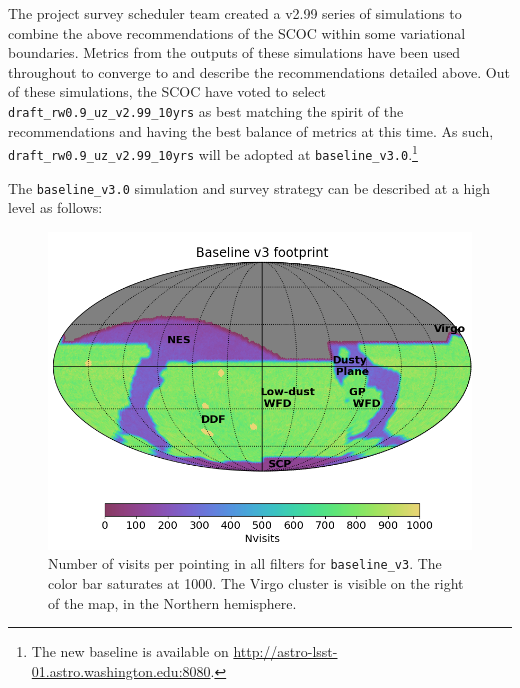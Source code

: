 The project survey scheduler team created a v2.99 series of simulations to combine the above recommendations of the SCOC within some variational boundaries. Metrics from the outputs of these simulations have been used throughout to converge to and describe the recommendations detailed above. Out of these simulations, the SCOC have voted to select \texttt{draft\_rw0.9\_uz\_v2.99\_10yrs} as best matching the spirit of the recommendations and having the best balance of metrics at this time. As such, \texttt{draft\_rw0.9\_uz\_v2.99\_10yrs} will be adopted at \texttt{baseline\_v3.0}.\footnote{The new baseline is available on \url{http://astro-lsst-01.astro.washington.edu:8080}.} 



The \texttt{baseline\_v3.0} simulation and survey strategy can be described at a high level as follows:
\begin{figure}[h!]
    \centering
    \includegraphics[width=4.7in]{figures/v3footprint.png}
    \caption{Number of visits per pointing in all filters for \texttt{baseline\_v3}. The color bar saturates at 1000. The Virgo cluster is visible on the right of the map, in the Northern hemisphere.%
    }\label{fig:baselinev3Footprint}
\end{figure}



